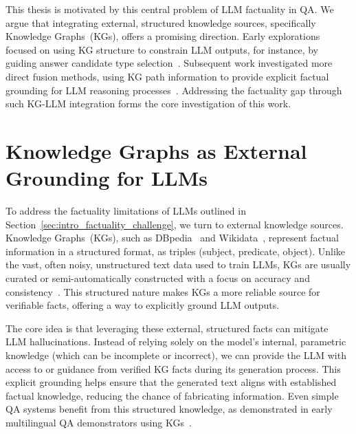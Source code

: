 This thesis is motivated by this central problem of LLM factuality in QA. We argue that integrating external, structured knowledge sources, specifically Knowledge Graphs~(KGs), offers a promising direction. Early explorations focused on using KG structure to constrain LLM outputs, for instance, by guiding answer candidate type selection~\cite{DBLP:journals/corr/abs-2310-07008}. Subsequent work investigated more direct fusion methods, using KG path information to provide explicit factual grounding for LLM reasoning processes~\cite{DBLP:journals/corr/abs-2310-02166}. Addressing the factuality gap through such KG-LLM integration forms the core investigation of this work.

\section{Knowledge Graphs as External Grounding for LLMs}
\label{sec:intro_kg_grounding}

To address the factuality limitations of LLMs outlined in Section~\ref{sec:intro_factuality_challenge}, we turn to external knowledge sources. Knowledge Graphs~(KGs), such as DBpedia~\cite{dbpedia} and Wikidata~\cite{wikidata}, represent factual information in a structured format, as triples (subject, predicate, object). Unlike the vast, often noisy, unstructured text data used to train LLMs, KGs are usually curated or semi-automatically constructed with a focus on accuracy and consistency~\cite{singhal2012introducing}. This structured nature makes KGs a more reliable source for verifiable facts, offering a way to explicitly ground LLM outputs.

The core idea is that leveraging these external, structured facts can mitigate LLM hallucinations. Instead of relying solely on the model's internal, parametric knowledge (which can be incomplete or incorrect), we can provide the LLM with access to or guidance from verified KG facts during its generation process. This explicit grounding helps ensure that the generated text aligns with established factual knowledge, reducing the chance of fabricating information. Even simple QA systems benefit from this structured knowledge, as demonstrated in early multilingual QA demonstrators using KGs~\cite{DBLP:conf/acl/RazzhigaevSMBP23}.

